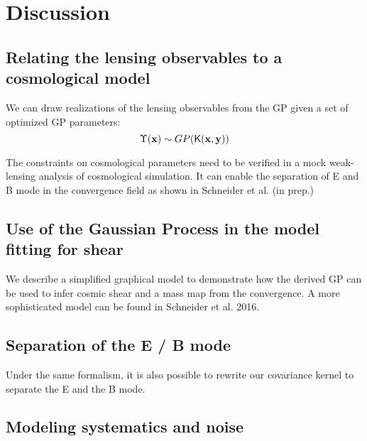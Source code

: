 \section{Discussion}

\subsection{Relating the lensing observables to a cosmological model}


We can draw realizations of the lensing observables from the GP given a set of
optimized GP parameters:
\begin{equation}
	\Upsilon(\mathbf{x}) \sim GP(\mathsf{K}(\mathbf{x}, \mathbf{y})) 
\end{equation}


The constraints on cosmological parameters need to be verified in a mock
weak-lensing analysis of cosmological simulation. 
It can enable the separation of E and B mode in the convergence field as shown
in Schneider et al. (in prep.) 

\subsection{Use of the Gaussian Process in the model fitting for shear}
We describe a simplified graphical model to demonstrate how the derived GP can
be used to infer cosmic shear and a mass map from the convergence.
A more sophisticated model can be found in Schneider et al. 2016.








\subsection{Separation of the E / B mode}
Under the same formalism, it is also possible to rewrite our covariance kernel 
to separate the E and the B mode. 

\subsection{Modeling systematics and noise}

